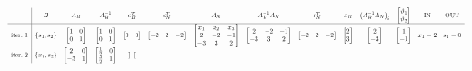 \begin{equation*}
\scalemath{0.65}{
\begin{array}{ c|c c c c c c c c c c c c c }
 & B & A_{B} & A_{B}^{-1} & c_{B}^{T} & c_{N}^{T} & A_{N} & A_{B}^{-1} A_{N} & r_{N}^{T} & x_{B} & \left( A_{B}^{-1} A_{N}\right)_{i} & \begin{bmatrix}
\vartheta _{1}\\
\vartheta _{2}
\end{bmatrix} & \text{IN} & \text{OUT}\\
\hline
\text{iter.} \ 1 & \{s_{1} ,s_{2}\} & \begin{bmatrix}
1 & 0\\
0 & 1
\end{bmatrix} & \begin{bmatrix}
1 & 0\\
0 & 1
\end{bmatrix} & \begin{bmatrix}
0 & 0
\end{bmatrix} & \begin{bmatrix}
-2 & 2 & -2
\end{bmatrix} & \begin{bmatrix}
x_{1} & x_{2} & x_{3}\\
2 & -2 & -1\\
-3 & 3 & 2
\end{bmatrix} & \begin{bmatrix}
2 & -2 & -1\\
-3 & 3 & 2
\end{bmatrix} & \begin{bmatrix}
-2 & 2 & -2
\end{bmatrix} & \begin{bmatrix}
2\\
3
\end{bmatrix} & \begin{bmatrix}
2\\
-3
\end{bmatrix} & \begin{bmatrix}
1\\
-1
\end{bmatrix} & x_{1} =2 & s_{1} =0\\
\text{iter.} \ 2 & \{x_{1} ,s_{2}\} & \begin{bmatrix}
2 & 0\\
-3 & 1
\end{bmatrix} & \begin{bmatrix}
\frac{1}{2} & 0\\
\frac{3}{2} & 1
\end{bmatrix} & \begin{bmatrix}

\end{bmatrix}
\end{array}}
\end{equation*}
